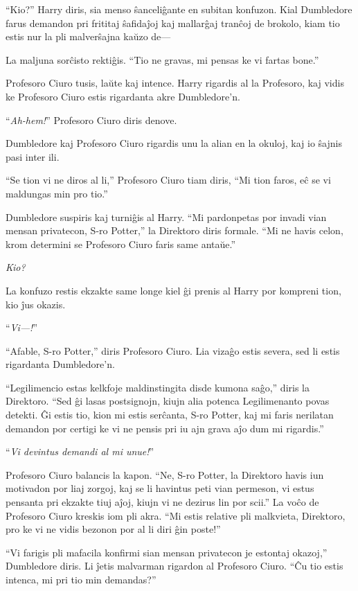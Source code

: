 ``Kio?'' Harry diris, sia menso ŝanceliĝante en subitan konfuzon. Kial
Dumbledore farus demandon pri frititaj ŝafidaĵoj kaj mallarĝaj tranĉoj
de brokolo, kiam tio estis nur la pli malverŝajna kaŭzo de—


La maljuna sorĉisto rektiĝis. ``Tio ne gravas, mi pensas ke vi fartas bone.''

Profesoro Ciuro tusis, laŭte kaj intence. Harry rigardis al la
Profesoro, kaj vidis ke Profesoro Ciuro estis rigardanta akre
Dumbledore'n.

``\emph{Ah-hem!}'' Profesoro Ciuro diris denove.

Dumbledore kaj Profesoro Ciuro rigardis unu la alian en la okuloj, kaj io ŝajnis pasi inter ili.

``Se tion vi ne diros al li,'' Profesoro Ciuro tiam diris, ``Mi tion faros, eĉ se vi maldungas min pro tio.''

Dumbledore suspiris kaj turniĝis al Harry. ``Mi pardonpetas por invadi
vian mensan privatecon, S-ro Potter,'' la Direktoro diris
formale. ``Mi ne havis celon, krom determini se Profesoro Ciuro faris
same antaŭe.''

\emph{Kio?}

La konfuzo restis ekzakte same longe kiel ĝi prenis al Harry por
kompreni tion, kio ĵus okazis.

``\emph{Vi—!}''

``Afable, S-ro Potter,'' diris Profesoro Ciuro. Lia vizaĝo estis
severa, sed li estis rigardanta Dumbledore'n.

``Legilimencio estas kelkfoje maldinstingita disde kumona saĝo,''
diris la Direktoro. ``Sed ĝi lasas postsignojn, kiujn alia potenca
Legilimenanto povas detekti. Ĝi estis tio, kion mi estis serĉanta,
S-ro Potter, kaj mi faris nerilatan demandon por certigi ke vi ne
pensis pri iu ajn grava aĵo dum mi rigardis.''

``\emph{Vi devintus demandi al mi unue!}''

Profesoro Ciuro balancis la kapon. ``Ne, S-ro Potter, la Direktoro
havis iun motivadon por liaj zorgoj, kaj se li havintus peti vian
permeson, vi estus pensanta pri ekzakte tiuj aĵoj, kiujn vi ne dezirus
lin por scii.'' La voĉo de Profesoro Ciuro kreskis iom pli akra. ``Mi
estis relative pli malkvieta, Direktoro, pro ke vi ne vidis bezonon
por al li diri ĝin poste!''

``Vi farigis pli mafacila konfirmi sian mensan privatecon je estontaj
okazoj,'' Dumbledore diris. Li ĵetis malvarman rigardon al Profesoro
Ciuro. ``Ĉu tio estis intenca, mi pri tio min demandas?''

